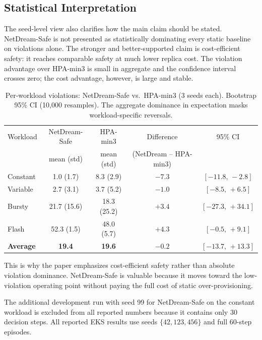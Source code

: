 \subsection{Statistical Interpretation}
\label{app:stats}

The seed-level view also clarifies how the main claim should be stated.
NetDream-Safe is not presented as statistically dominating every static
baseline on violations alone.  The stronger and better-supported claim is
cost-efficient safety: it reaches comparable safety at much lower
replica cost.  The violation advantage over HPA-min3 is small in
aggregate and the confidence interval crosses zero; the cost advantage,
however, is large and stable.

\begin{table}[H]
\centering
\small
\caption{Per-workload violations: NetDream-Safe vs.\ HPA-min3 (3 seeds each).
Bootstrap 95\% CI (10,000 resamples). The aggregate dominance in
expectation masks workload-specific reversals.}
\label{tab:bootstrap}
\begin{tabular}{@{}lcccc@{}}
\toprule
Workload & NetDream-Safe & HPA-min3 & Difference & 95\% CI \\
         & mean (std) & mean (std) & (NetDream -- HPA-min3) & \\
\midrule
Constant & 1.0 (1.7) & 8.3 (2.9) & $-7.3$ & $[-11.8,\,-2.8]$ \\
Variable & 2.7 (3.1) & 3.7 (5.2) & $-1.0$ & $[-8.5,\,+6.5]$ \\
Bursty   & 21.7 (15.6) & 18.3 (25.2) & $+3.4$ & $[-27.3,\,+34.1]$ \\
Flash    & 52.3 (1.5) & 48.0 (5.7) & $+4.3$ & $[-0.5,\,+9.1]$ \\
\midrule
\textbf{Average} & \textbf{19.4} & \textbf{19.6} & \boldmath$-0.2$ & $[-13.7,\,+13.3]$ \\
\bottomrule
\end{tabular}
\end{table}

This is why the paper emphasizes cost-efficient safety rather than
absolute violation dominance.  NetDream-Safe is valuable because it moves
toward the low-violation operating point without paying the full cost of
static over-provisioning.

The additional development run with seed 99 for NetDream-Safe on the
constant workload is excluded from all reported numbers because it
contains only 30 decision steps.  All reported EKS results use seeds
$\{42,123,456\}$ and full 60-step episodes.

